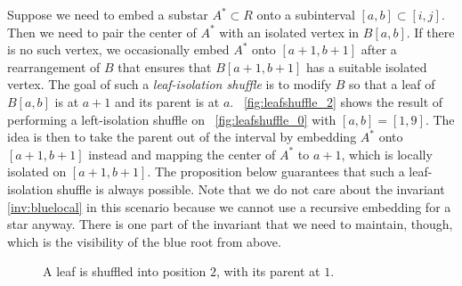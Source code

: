 \documentclass[11pt,a4paper,colorlinks=true,urlcolor=blue,citecolor=red]{article}
\theoremstyle{plain}
\begin{document}
Suppose we need to embed a substar $A^*\subset R$ onto a subinterval
$[a,b]\subset[i,j]$. Then we need to pair the center of $A^*$ with an
isolated vertex in $B[a,b]$. If there is no such vertex, we occasionally
embed $A^*$ onto $[a+1,b+1]$ after a rearrangement of $B$ that ensures
that $B[a+1,b+1]$ has a suitable isolated vertex. The goal of such a
\emph{leaf-isolation shuffle} is to modify $B$ so that a leaf of
$B[a,b]$ is at $a+1$ and its parent is at
$a$. \figurename~\ref{fig:leafshuffle_2} shows the result of performing
a left-isolation shuffle on \figurename~\ref{fig:leafshuffle_0} with
$[a,b]=[1,9]$. The idea is then to take the parent out of the interval
by embedding $A^*$ onto $[a+1,b+1]$ instead and mapping the center of
$A^*$ to $a+1$, which is locally isolated on $[a+1,b+1]$. The
proposition below guarantees that such a leaf-isolation shuffle is
always possible. Note that we do not care about the invariant
\ref{inv:bluelocal} in this scenario because we cannot use a recursive
embedding for a star anyway. There is one part of the invariant that we
need to maintain, though, which is the visibility of the blue root from
above.
\begin{figure}[htbp]
  \centering\hfil {}\hfil
  \hfil
  \hfil
  \caption{A leaf is shuffled into position $2$, with its parent at
    $1$.\label{fig:leafshuffle}}
\end{figure}
\end{document}
